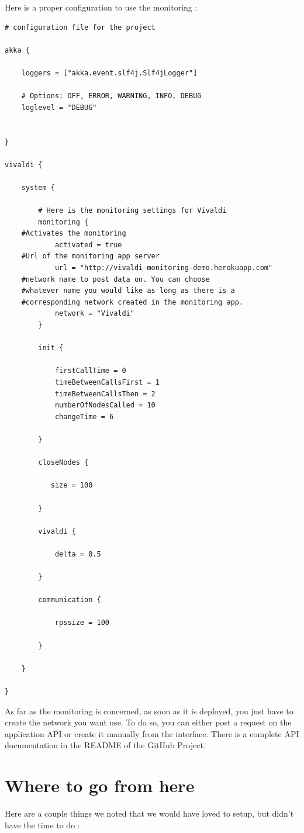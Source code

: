 \documentclass[11pt,a4paper]{article}
\begin{document}
Here is a proper configuration to use the monitoring :
\begin{verbatim}
# configuration file for the project

akka {

    loggers = ["akka.event.slf4j.Slf4jLogger"]

    # Options: OFF, ERROR, WARNING, INFO, DEBUG
    loglevel = "DEBUG"


}

vivaldi {

    system {

        # Here is the monitoring settings for Vivaldi
        monitoring {
	#Activates the monitoring
            activated = true
	#Url of the monitoring app server
            url = "http://vivaldi-monitoring-demo.herokuapp.com"
	#network name to post data on. You can choose
	#whatever name you would like as long as there is a 
	#corresponding network created in the monitoring app.
            network = "Vivaldi"
        }

        init {

            firstCallTime = 0
            timeBetweenCallsFirst = 1
            timeBetweenCallsThen = 2
            numberOfNodesCalled = 10
            changeTime = 6

        }

        closeNodes {

           size = 100

        }

        vivaldi {

            delta = 0.5

        }

        communication {

            rpssize = 100

        }

    }

}
\end{verbatim}

As far as the monitoring is concerned, as soon as it is deployed, you just have to create the network you want use. To do so, you can either post a request on the application API or create it manually from the interface. There is a complete API documentation in the README of the GitHub Project. 

\section{Where to go from here}
 Here are a couple things we noted that we would have loved to setup, but didn't have the time to do :
 
\end{document}
